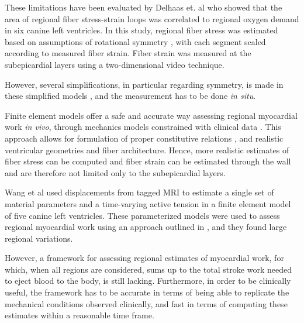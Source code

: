 These limitations have been evaluated by Delhaas et. al
\cite{delhaas1994regional} who showed that
the area of regional fiber stress-strain loops was correlated to
regional oxygen demand in six canine left ventricles. In this study,
regional fiber stress was estimated based on assumptions of rotational
symmetry \cite{arts1991relation}, with each segment scaled according to
measured fiber strain. Fiber strain was measured at the subepicardial
layers using a two-dimensional video technique.


However, several simplifications, in particular regarding symmetry, is
made in these simplified models \cite{zhang2011comparison}, and the
measurement has to be done {\it in situ}.

Finite element models offer a safe and accurate way assessing
regional myocardial work {\it in vivo}, through mechanics models
constrained with clinical data \cite{balaban2017high}. This approach
allows for formulation of proper constitutive relations
\cite{holzapfel2009constitutive}, and realistic ventricular geometries
and fiber architecture. Hence, more realistic estimates of fiber
stress can be computed and fiber strain can be estimated through the
wall and are therefore not limited only to the subepicardial layers. 



Wang et al \cite{wang2011myocardial} used displacements from
tagged MRI to estimate a single set of material parameters and a
time-varying active tension in a finite element model of five
canine left ventricles. These parameterized models were used to assess
regional myocardial work using an approach outlined in
\cite{niederer2009role}, and they found large regional variations.


However, a framework for assessing regional estimates of myocardial
work, for which, when all regions are considered, sums up to the total
stroke work needed to eject blood to the body, is still
lacking. Furthermore, in order to be clinically useful, the framework
has to be accurate in terms of being able to replicate the mechanical
conditions observed clinically, and fast in terms of computing these
estimates within a reasonable time frame.

